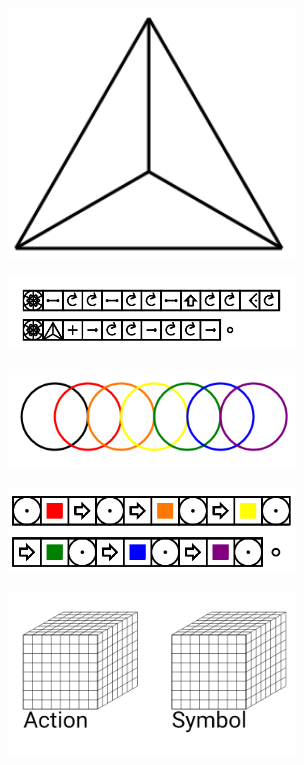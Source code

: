 \documentclass[11pt]{article}
\begin{document}
\includegraphics[width=3in]{image18.png}

\includegraphics[width=3in]{image19.png}





\includegraphics[width=3in]{image20.png}

\includegraphics[width=3in]{image21.png}





\includegraphics[width=3in]{image22.png}
\end{document}
